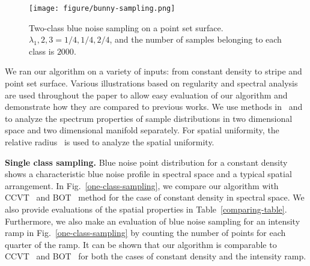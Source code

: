 \begin{figure}[htb]
  \centering
  \texttt{[image: figure/bunny-sampling.png]}
  \caption{Two-class blue noise sampling on a point set surface.
  $\lambda_1,2,3=1/4,1/4,2/4$, and the number of samples belonging to each class is $2000$.  }\label{bunny-sampling}
\end{figure}
We ran our algorithm on a variety of inputs:
from constant density to stripe and point set surface.
Various illustrations based on regularity and spectral analysis are
used throughout the paper to allow easy evaluation of our algorithm and  demonstrate how they  are compared to previous works.
We use methods in~\cite{schlomer:2011:accurate} and~\cite{wei:2011:differential} to analyze the
spectrum properties of sample distributions in two dimensional space and two dimensional manifold separately.
For spatial uniformity,
the relative radius~\cite{Lagae:2008:CPDD} is used to analyze the spatial uniformity.

\textbf{Single class sampling.}
Blue noise point distribution for a constant density
shows a characteristic blue noise profile in spectral space
and a typical spatial arrangement.
In Fig.~\ref{one-class-sampling},
we compare our algorithm with CCVT~\cite{balzer:2009:capacity} and BOT~\cite{de:2012:blue} method for the case of constant density in spectral space.
We also provide evaluations of the spatial properties in Table~\ref{comparing-table}.
Furthermore,
we also make an evaluation of blue noise sampling for an intensity ramp in Fig.~\ref{one-class-sampling}
by counting the number of points for each
quarter of the ramp.
It can be shown that our algorithm is comparable to CCVT~\cite{balzer:2009:capacity} and BOT~\cite{de:2012:blue} for both the cases of constant density and the intensity ramp.

